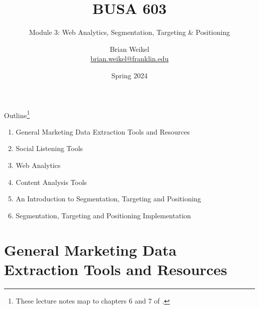 \documentclass[pdf]{beamer}
\title{BUSA 603}
\subtitle{Module 3:   Web Analytics, Segmentation, Targeting \& Positioning}
\theoremstyle{remark}
\theoremstyle{definition}
\begin{document}
\author[B. Weikel, Franklin University]{
	\begin{tabular}{c} 
	\Large
	Brian Weikel\\
    \footnotesize \href{mailto:brian.weikel@franklin.edu}{brian.weikel@franklin.edu}
    \vspace{1ex}
\end{tabular}
\vspace{-4ex}}


\date{Spring 2024}%

\begin{noheadline}
\begin{frame}[t]\maketitle\end{frame}
\end{noheadline}

\begin{frame}[t]{Outline\footnote{These lecture notes map to chapters 6 and 7 of \cite{davis2022}.}}
\begin{enumerate}
\item General Marketing Data Extraction Tools and Resources
\vspace{1.5ex}
\item Social Listening Tools
\vspace{1.5ex}
\item Web Analytics
\vspace{1.5ex}
\item Content Analysis Tools
\vspace{1.5ex}
\item An Introduction to Segmentation, Targeting and Positioning 
\vspace{1.5ex}
\item Segmentation, Targeting and Positioning Implementation
\end{enumerate}
\end{frame}

\section{General Marketing Data Extraction Tools and Resources}
\end{document}
